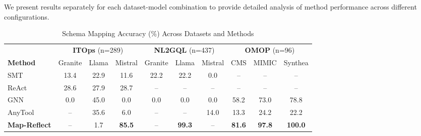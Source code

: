 \documentclass[sigconf, nonacm]{acmart}
\begin{document}
We present results separately for each dataset-model combination to provide detailed analysis of method performance across different configurations.

  \begin{table}[htbp]
  \centering
  \caption{Schema Mapping Accuracy (\%) Across Datasets and Methods}
  \label{tab:main_results}
  \begin{tabular}{l|ccc|ccc|ccc}
  \toprule
  & \multicolumn{3}{c|}{\textbf{ITOps} (n=289)} & \multicolumn{3}{c|}{\textbf{NL2GQL} (n=437)} & \multicolumn{3}{c}{\textbf{OMOP} (n=96)} \\
  \textbf{Method} & Granite & Llama & Mistral & Granite & Llama & Mistral & CMS & MIMIC & Synthea \\
  \midrule
  SMT & 13.4 & 22.9 & 11.6 & 22.2 & 22.2 & 0.0 & -- & -- & -- \\
  ReAct & 28.6 & 27.9 & 28.7 & -- & -- & -- & -- & -- & -- \\
  GNN & 0.0 & 45.0 & 0.0 & 0.0 & 0.0 & 0.0 & 58.2 & 73.0 & 78.8 \\
  AnyTool & -- & 35.6 & 6.0 & -- & -- & 14.0 & 13.3 & 24.2 & 22.2 \\
  \midrule
  \textbf{Map-Reflect} & -- & 1.7 & \textbf{85.5} & -- & \textbf{99.3} & -- & \textbf{81.6} & \textbf{97.8} & \textbf{100.0} \\
  \bottomrule
  \end{tabular}
  \end{table}
\end{document}
